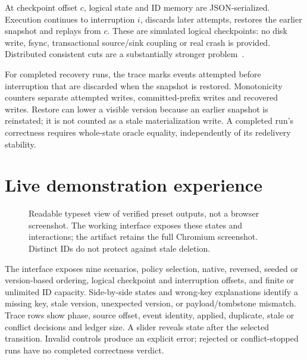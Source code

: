 \documentclass[sigconf,9pt]{acmart}
\begin{document}
At checkpoint offset $c$, logical state and ID memory are JSON-serialized. Execution
continues to interruption $i$, discards later attempts, restores the earlier snapshot
and replays from $c$. These are simulated logical checkpoints: no disk write,
fsync, transactional source/sink coupling or real crash is provided. Distributed
consistent cuts are a substantially stronger problem~\cite{snapshots}.

For completed recovery runs, the trace marks events attempted before interruption
that are discarded when the snapshot is restored. Monotonicity counters
separate attempted writes, committed-prefix writes and recovered writes. Restore can
lower a visible version because an earlier snapshot is reinstated; it is not counted
as a stale materialization write. A completed run's correctness requires whole-state
oracle equality, independently of its redelivery stability.

\section{Live demonstration experience}
\begin{figure}[t]
\centering
{}
\caption{Readable typeset view of verified preset outputs, not a browser screenshot.
The working interface exposes these states and interactions; the artifact retains
the full Chromium screenshot. Distinct IDs do not protect against stale deletion.}
\label{fig:ui}
\end{figure}
The interface exposes nine scenarios, policy selection, native, reversed, seeded or version-based
ordering, logical checkpoint and interruption offsets, and finite or unlimited ID
capacity. Side-by-side states and wrong-key explanations identify a missing key,
stale version, unexpected version, or payload/tombstone mismatch. Trace rows show
phase, source offset, event identity, applied, duplicate, stale or conflict decisions and
ledger size. A slider reveals state after the selected transition. Invalid controls
produce an explicit error; rejected or conflict-stopped runs have no completed
correctness verdict.
\end{document}
